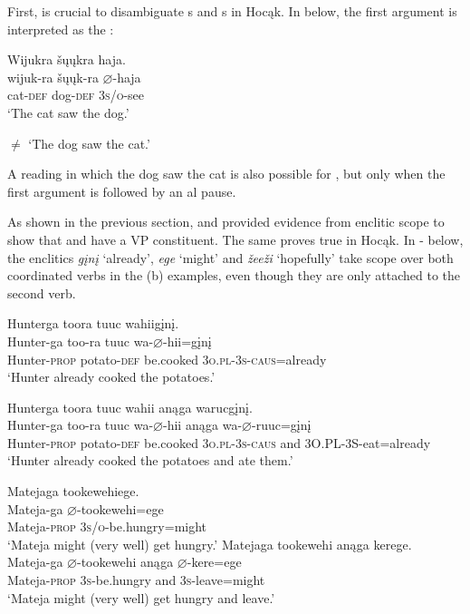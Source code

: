 \documentclass[output=paper]{LSP/langsci}
\begin{document}
First,  is crucial to disambiguate s and s in Hocąk.  In  below, the first argument is interpreted as the :
 
\let\eachwordtwo=\itshape

\begin{exe}
\ex\label{ex:jrs:31} 
\glll Wijukra	\v{s}\k{u}\k{u}kra 		haja.\\
wijuk-ra 		\v{s}\k{u}\k{u}k-ra 		$\varnothing$-haja \\
cat-\textsc{def} 		dog-\textsc{def} 	\textsc{3s/o}-see \\
\trans `The cat saw the dog.'

$\neq$ `The dog saw the cat.'
\end{exe}

A reading in which the dog saw the cat is also possible for , but only when the first argument is followed by an al pause.
	
 
As shown in the previous section, \citet{Boyle2007} and \citet{West2003} provided evidence from enclitic scope to show that  and  have a VP constituent.  The same proves true in Hocąk.  In - below, the enclitics \textit{g\k{i}n\k{i}} `already', \textit{ege} `might' and \textit{\v{z}ee\v{z}i} `hopefully' take scope over both coordinated verbs in the (b) examples, even though they are only attached to the second verb.
 

\ea\label{ex:jrs:32}
\ea
\glll Hunterga 	toora 	tuuc 	wahiig\k{i}n\k{i}. \\
Hunter-ga 	too-ra 	tuuc 	wa-$\varnothing$-hii=g\k{i}n\k{i} \\
	Hunter-\textsc{prop} potato-\textsc{def} 	be.cooked 	\textsc{3o.pl-3s-caus}=already \\
\trans `Hunter already cooked the potatoes.' 

\ex
\glll Hunterga  	toora 		tuuc 		wahii 	anąga 	warucg\k{i}n\k{i}. \\
Hunter-ga  too-ra	tuuc 	wa-$\varnothing$-hii 	 anąga wa-$\varnothing$-ruuc=g\k{i}n\k{i} \\
Hunter-\textsc{prop} potato-\textsc{def} 	be.cooked	 \textsc{3o.pl-3s-caus} and 3O.PL-3S-eat=already\\
\trans`Hunter already cooked the potatoes and ate them.'
\z
\z

\ea\label{ex:jrs:33}
\ea
\glll Matejaga 	tookewehiege. \\
Mateja-ga 	$\varnothing$-tookewehi=ege \\
	Mateja-\textsc{prop} 	\textsc{3s/o}-be.hungry=might \\
\trans `Mateja might (very well) get hungry.' 
\ex
\glll Matejaga 			tookewehi 		anąga 	kerege. \\
Mateja-ga 			$\varnothing$-tookewehi 	anąga 	$\varnothing$-kere=ege  \\
Mateja-\textsc{prop} 	\textsc{3s}-be.hungry and 			\textsc{3s}-leave=might \\
\trans `Mateja might (very well) get hungry and leave.'
\z
\z
\end{document}
